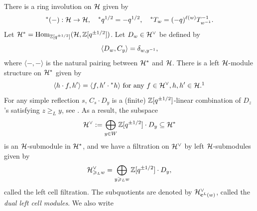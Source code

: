 \documentclass[reqno]{amsart}
\begin{document}
There is a ring involution on $\mathcal{H}$ given by
\begin{equation*}
	{}^*(-) : \mathcal{H} \to \mathcal{H},\quad
	{}^*q^{1/2} = - q^{1/2},\quad
	{}^*T_w = (-q)^{\ell(w)} T_{w^{-1}}^{-1}.
\end{equation*}
Let $\mathcal{H}^* = \operatorname{Hom}_{\mathbb{Z}[q^{\pm1/2}]}(\mathcal{H},\mathbb{Z}[q^{\pm1/2}])$. Let $D_w \in \mathcal{H}^\vee$ be defined by
\begin{equation*}
	\langle D_w, C_y \rangle = \delta_{w,y^{-1}},
\end{equation*}
where $\langle -,- \rangle$ is the natural pairing between $\mathcal{H}^*$ and $\mathcal{H}$.
There is a left $\mathcal{H}$-module structure on $\mathcal{H}^*$ given by
\begin{equation}\label{eqn:H-acts-on-H*}
	\langle h \cdot f, h' \rangle = \langle f, h' \cdot {}^*h \rangle \text{ for any } f \in \cH^\vee, h,h' \in \cH.\footnotemark
\end{equation}
%
For any simple reflection $s$, $C_s \cdot D_y$ is a (finite) $\mathbb{Z}[q^{\pm1/2}]$-linear combination of $D_z$'s satisfying $z \ge_L y$, see \cite[(5.1.16)]{Lusztig:char}. As a result, the subspace
\begin{equation*}
	\mathcal{H}^\vee := \bigoplus_{y \in W} \mathbb{Z}[q^{\pm 1/2}] \cdot D_y \subseteq \mathcal{H}^*
\end{equation*}
is an $\mathcal{H}$-submodule in $\mathcal{H}^*$, and we have a filtration on $\mathcal{H}^\vee$ by left $\mathcal{H}$-submodules given by
\begin{equation*}
	\mathcal{H}_{\geqslant_L w}^\vee = \bigoplus_{y \geqslant_L w} \mathbb{Z}[q^{\pm1/2}] \cdot D_y,
\end{equation*}
called the left cell filtration. The subquotients are denoted by $\mathcal{H}_{\mathbf{c}^L(w)}^\vee$, called the \textit{dual left cell modules}. We also write
\end{document}
